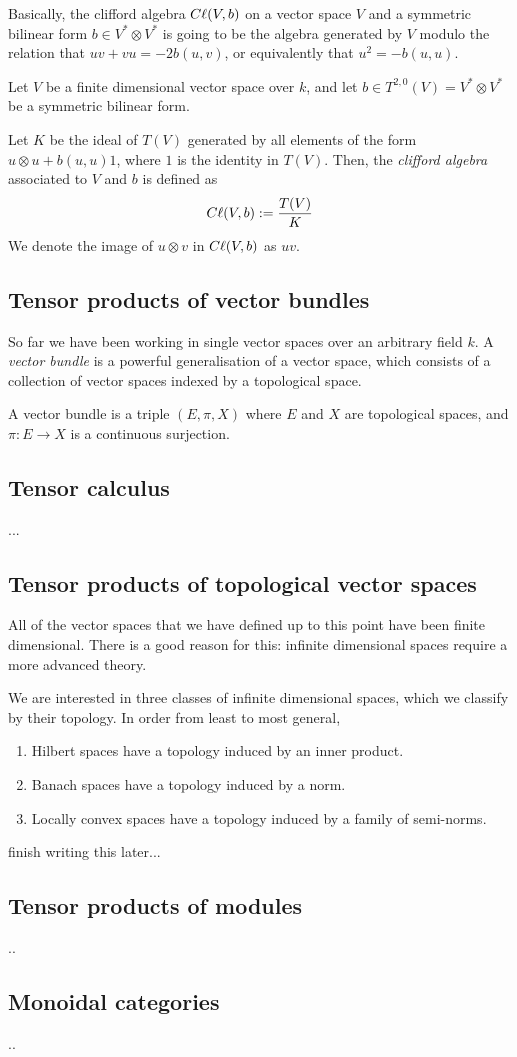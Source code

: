 Basically, the clifford algebra $C\ell(V,b)$
on a vector space $V$ and a symmetric bilinear form $b \in V^* \otimes V^*$
is going to be the algebra generated by $V$ modulo the relation
that $uv+vu = -2b(u,v)$, or equivalently that $u^2 = -b(u,u)$. 
\begin{definition}
    Let $V$ be a finite dimensional vector space over $k$, and 
    let $b \in T^{2,0}(V) = V^* \otimes V^*$ be a symmetric bilinear form.

    Let $K$ be the ideal of $T(V)$ generated by all elements
    of the form $u\otimes u + b(u,u)1$, where $1$ is the identity
    in $T(V)$. Then, the \emph{clifford algebra} associated to
    $V$ and $b$ is defined as
    \begin{equation*}
        C\ell(V,b) := \frac{T(V)}{K}
    \end{equation*}
    We denote the image of $u \otimes v$ in $C\ell(V,b)$ as $uv$.
\end{definition}


\subsection{Tensor products of vector bundles}

So far we have been working in single vector spaces
over an arbitrary field $k$. A \emph{vector bundle} is a powerful
generalisation of a vector space, which consists of a collection
of vector spaces indexed by a topological space. 
\begin{definition}
    A vector bundle is a triple $(E,\pi,X)$ where $E$
    and $X$ are topological spaces, and $\pi:E\rightarrow X$
    is a continuous surjection.
\end{definition}

\subsection{Tensor calculus}
...

\subsection{Tensor products of topological vector spaces}

All of the vector spaces that we have defined up to this point
have been finite dimensional. There is a good reason for this:
infinite dimensional spaces require a more advanced theory.

We are interested in three classes of infinite dimensional
spaces, which we classify by their topology. In order from
least to most general,
\begin{enumerate}
\item{} Hilbert spaces have a topology induced by an inner product.
\item{} Banach spaces have a topology induced by a norm.
\item{} Locally convex spaces have a topology induced by a family of semi-norms.
\end{enumerate}
finish writing this later...

\subsection{Tensor products of modules}
..

\subsection{Monoidal categories}
..
